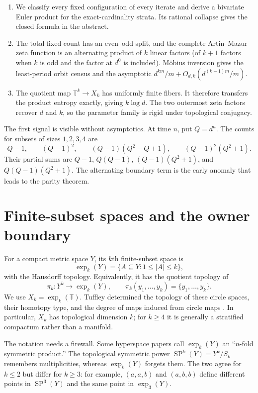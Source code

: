 \documentclass[11pt,a4paper]{amsart}
\theoremstyle{definition}
\theoremstyle{remark}
\newcommand{\T}{\mathbb T}
\newcommand{\card}[1]{\lvert #1\rvert}
\begin{document}
\begin{enumerate}
\item We classify every fixed configuration of every iterate and derive a
  bivariate Euler product for the exact-cardinality strata.  Its rational
  collapse gives the closed formula in the abstract.
\item The total fixed count has an even--odd split, and the complete
  Artin--Mazur zeta function is an alternating product of $k$ linear factors
  (of $k+1$ factors when $k$ is odd and the factor at $d^0$ is included).
  M\"obius inversion gives the least-period orbit census and the asymptotic
  $d^{km}/m+O_{d,k}(d^{(k-1)m}/m)$.
\item The quotient map $\T^k\to X_k$ has uniformly finite fibers.  It
  therefore transfers the product entropy exactly, giving $k\log d$.  The
  two outermost zeta factors recover $d$ and $k$, so the parameter family is
  rigid under topological conjugacy.
\end{enumerate}

The first signal is visible without asymptotics.  At time $n$, put $Q=d^n$.
The counts for subsets of sizes $1,2,3,4$ are
\[
 Q-1,\qquad (Q-1)^2,\qquad (Q-1)(Q^2-Q+1),\qquad
 (Q-1)^2(Q^2+1).
\]
Their partial sums are $Q-1$, $Q(Q-1)$,
$(Q-1)(Q^2+1)$, and $Q(Q-1)(Q^2+1)$.  The alternating boundary term is the
early anomaly that leads to the parity theorem.

\section{Finite-subset spaces and the owner boundary}

For a compact metric space $Y$, its $k$th finite-subset space is
\[
 \exp_k(Y)=\{A\subseteq Y:1\leq\card A\leq k\},
\]
with the Hausdorff topology.  Equivalently, it has the quotient topology of
\[
 \pi_k:Y^k\longrightarrow \exp_k(Y),\qquad
 \pi_k(y_1,\ldots,y_k)=\{y_1,\ldots,y_k\}.
\]
We use $X_k=\exp_k(\T)$.  Tuffley determined the topology of these circle
spaces, their homotopy type, and the degree of maps induced from circle maps
\cite{Tuffley2002}.  In particular, $X_k$ has topological dimension $k$;
for $k\geq4$ it is generally a stratified compactum rather than a manifold.

The notation needs a firewall.  Some hyperspace papers call $\exp_k(Y)$ an
``$n$-fold symmetric product.''  The topological symmetric power
$\operatorname{SP}^k(Y)=Y^k/S_k$ remembers multiplicities, whereas
$\exp_k(Y)$ forgets them.  The two agree for $k\leq2$ but differ for
$k\geq3$: for example, $(a,a,b)$ and $(a,b,b)$ define different points in
$\operatorname{SP}^3(Y)$ and the same point in $\exp_3(Y)$.
\end{document}
